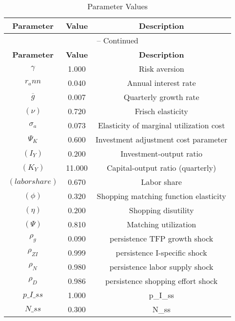 \begin{center}
\begin{longtable}{ccc}
\caption{Parameter Values}\\%
\toprule%
\multicolumn{1}{c}{\textbf{Parameter}} &
\multicolumn{1}{c}{\textbf{Value}} &
 \multicolumn{1}{c}{\textbf{Description}}\\%
\midrule%
\endfirsthead
\multicolumn{3}{c}{{\tablename} \thetable{} -- Continued}\\%
\midrule%
\multicolumn{1}{c}{\textbf{Parameter}} &
\multicolumn{1}{c}{\textbf{Value}} &
  \multicolumn{1}{c}{\textbf{Description}}\\%
\midrule%
\endhead
${\gamma}$ 	 & 	 1.000 	 & 	 Risk aversion\\
${r_ann}$ 	 & 	 0.040 	 & 	 Annual interest rate\\
${\overline{g}}$ 	 & 	 0.007 	 & 	 Quarterly growth rate\\
$(\nu)$ 	 & 	 0.720 	 & 	 Frisch elasticity\\
${\sigma_a}$ 	 & 	 0.073 	 & 	 Elasticity of marginal utilization cost\\
${\Psi_K}$ 	 & 	 0.600 	 & 	 Investment adjustment cost parameter\\
$(I_Y)$ 	 & 	 0.200 	 & 	 Investment-output ratio\\
$(K_Y)$ 	 & 	 11.000 	 & 	 Capital-output ratio (quarterly)\\
$(labor share)$ 	 & 	 0.670 	 & 	 Labor share\\
$(\phi)$ 	 & 	 0.320 	 & 	 Shopping matching function elasticity\\
$(\eta)$ 	 & 	 0.200 	 & 	 Shopping disutility\\
$(\Psi)$ 	 & 	 0.810 	 & 	 Matching utilization\\
${\rho_g}$ 	 & 	 0.090 	 & 	 persistence TFP growth shock\\
${\rho_{ZI}}$ 	 & 	 0.999 	 & 	 persistence I-specific shock\\
${\rho_N}$ 	 & 	 0.980 	 & 	 persistence labor supply shock\\
${\rho_D}$ 	 & 	 0.986 	 & 	 persistence shopping effort shock\\
$p\_I\_ss$ 	 & 	 1.000 	 & 	 p\_I\_ss\\
$N\_ss$ 	 & 	 0.300 	 & 	 N\_ss\\
\bottomrule%
\end{longtable}
\end{center}
